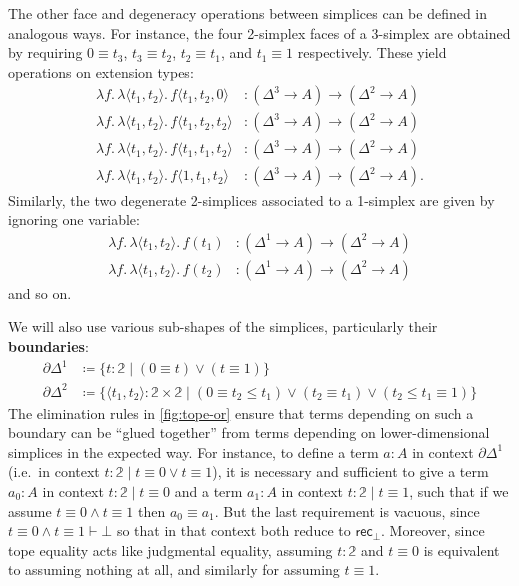 \documentclass{amsart}
\theoremstyle{plain}
\theoremstyle{definition}
\theoremstyle{remark}
\numberwithin{equation}{section}
\newcommand{\jdeq}{\equiv}
\newcommand{\defeq}{\coloneqq}
\newcommand{\types}{\vdash}
\newcommand{\sh}[2]{\{#1\mid #2\}}
\newcommand{\pair}[1]{\langle #1\rangle}
\newcommand{\rec}{\mathsf{rec}}
\newcommand{\lam}[1]{\lambda #1.\,}
\newcommand{\two}{\mathbb{2}}
\begin{document}
The other face and degeneracy operations between simplices can be defined in analogous ways.
For instance, the four 2-simplex faces of a 3-simplex are obtained by requiring $0\jdeq t_3$, $t_3\jdeq t_2$, $t_2\jdeq t_1$, and $t_1\jdeq 1$ respectively.
These yield operations on extension types:
\begin{align*}
  \lam{f} \lam{\pair{t_1,t_2}} f\pair{t_1,t_2,0} &: (\Delta^3 \to A) \to (\Delta^2 \to A)\\
  \lam{f} \lam{\pair{t_1,t_2}} f\pair{t_1,t_2,t_2} &: (\Delta^3 \to A) \to (\Delta^2 \to A)\\
  \lam{f} \lam{\pair{t_1,t_2}} f\pair{t_1,t_1,t_2} &: (\Delta^3 \to A) \to (\Delta^2 \to A)\\
  \lam{f} \lam{\pair{t_1,t_2}} f\pair{1,t_1,t_2} &: (\Delta^3 \to A) \to (\Delta^2 \to A).
\end{align*}
Similarly, the two degenerate 2-simplices associated to a 1-simplex are given by ignoring one variable:
\begin{align*}
  \lam{f} \lam{\pair{t_1,t_2}} f(t_1) &: (\Delta^1 \to A) \to (\Delta^2 \to A)\\
  \lam{f} \lam{\pair{t_1,t_2}} f(t_2) &: (\Delta^1 \to A) \to (\Delta^2 \to A)
\end{align*}
and so on.

We will also use various sub-shapes of the simplices, particularly their \textbf{boundaries}:
\begin{align*}
  \partial\Delta^1 &\defeq \sh{t:\two}{(0\jdeq t) \lor (t\jdeq 1)}\\
  \partial\Delta^2 &\defeq \sh{\pair{t_1,t_2}:\two\times\two}{(0\jdeq t_2\le t_1) \lor (t_2\jdeq t_1) \lor (t_2\le t_1 \jdeq 1)}
\end{align*}
The elimination rules in \cref{fig:tope-or} ensure that terms depending on such a boundary can be ``glued together'' from terms depending on lower-dimensional simplices in the expected way.
For instance, to define a term $a:A$ in context $\partial\Delta^1$ (i.e.\ in context $t:\two \mid t\jdeq 0 \lor t\jdeq 1$), it is necessary and sufficient to give a term $a_0:A$ in context $t:\two \mid t\jdeq 0$ and a term $a_1:A$ in context $t:\two\mid t\jdeq 1$, such that if we assume $t\jdeq 0 \land t\jdeq 1$ then $a_0\jdeq a_1$.
But the last requirement is vacuous, since $t\jdeq 0 \land t\jdeq 1 \types \bot$ so that in that context both reduce to $\rec_\bot$.
Moreover, since tope equality acts like judgmental equality, assuming $t:\two$ and $t\jdeq 0$ is equivalent to assuming nothing at all, and similarly {for assuming $t\jdeq 1$.}
\end{document}
